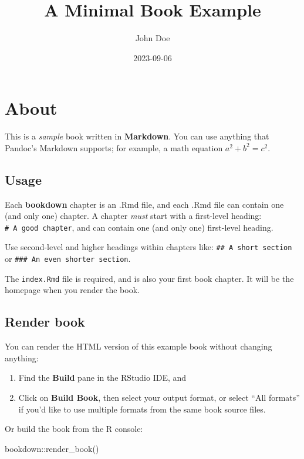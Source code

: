 \documentclass[
]{book}
\title{A Minimal Book Example}
\author{John Doe}
\date{2023-09-06}
\newenvironment{Shaded}{\begin{snugshade}}{\end{snugshade}}
\newcommand{\FunctionTok}[1]{\textcolor[rgb]{0.00,0.00,0.00}{#1}}
\newcommand{\NormalTok}[1]{#1}
\newcommand{\SpecialCharTok}[1]{\textcolor[rgb]{0.00,0.00,0.00}{#1}}
\begin{document}
\maketitle

{
\setcounter{tocdepth}{1}
\tableofcontents
}
\hypertarget{about}{%
\chapter{About}\label{about}}

This is a \emph{sample} book written in \textbf{Markdown}. You can use anything that Pandoc's Markdown supports; for example, a math equation \(a^2 + b^2 = c^2\).

\hypertarget{usage}{%
\section{Usage}\label{usage}}

Each \textbf{bookdown} chapter is an .Rmd file, and each .Rmd file can contain one (and only one) chapter. A chapter \emph{must} start with a first-level heading: \texttt{\#\ A\ good\ chapter}, and can contain one (and only one) first-level heading.

Use second-level and higher headings within chapters like: \texttt{\#\#\ A\ short\ section} or \texttt{\#\#\#\ An\ even\ shorter\ section}.

The \texttt{index.Rmd} file is required, and is also your first book chapter. It will be the homepage when you render the book.

\hypertarget{render-book}{%
\section{Render book}\label{render-book}}

You can render the HTML version of this example book without changing anything:

\begin{enumerate}
\def\labelenumi{\arabic{enumi}.}
\item
  Find the \textbf{Build} pane in the RStudio IDE, and
\item
  Click on \textbf{Build Book}, then select your output format, or select ``All formats'' if you'd like to use multiple formats from the same book source files.
\end{enumerate}

Or build the book from the R console:

\begin{Shaded}
\begin{Highlighting}[]
\NormalTok{bookdown}\SpecialCharTok{::}\FunctionTok{render\_book}\NormalTok{()}
\end{Highlighting}
\end{Shaded}
\end{document}
